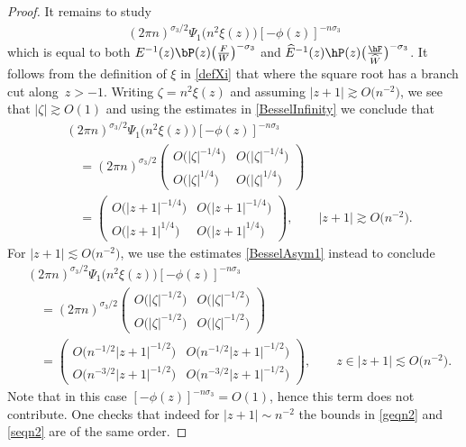 \begin{proof}
It remains to study
\begin{align*}
 (2\pi n)^{\sigma_3/2}\Psi_1\big(n^2 \xi(z)\big)[-\phi(z)]^{-n\sigma_3}
\end{align*}
which is equal to both $E^{-1}(z)\bP(z)\big(\frac{F}{W}\big)^{-\sigma_3}$ and $\widehat E^{-1}(z)\hP(z)\big(\frac{\hF}{\widehat W}\big)^{-\sigma_3}$. It follows from the definition of $\xi$ in \eqref{defXi} that  where the square root has a branch cut along~$z > -1$. Writing $\zeta=n^2 \xi(z)$ and assuming $|z+1| \gtrsim O\big(n^{-2}\big)$, we see that $|\zeta| \gtrsim O(1)$ and using the estimates in \eqref{BesselInfinity} we conclude that
\begin{align}\nonumber
& (2\pi n)^{\sigma_3/2}\Psi_1\big(n^2 \xi(z)\big)[-\phi(z)]^{-n\sigma_3} \\
&\quad= (2\pi n)^{\sigma_3/2}\begin{pmatrix}
 O\big(|\zeta|^{-1/4}\big) & O\big(|\zeta|^{-1/4}\big)
 \\
 O\big(|\zeta|^{1/4}\big) & O\big(|\zeta|^{1/4}\big)
 \end{pmatrix}\nonumber
 \\
 &\quad=
 \begin{pmatrix}
 O\big(|z+1|^{-1/4}\big) & O\big(|z+1|^{-1/4}\big)
 \\
 O\big(|z+1|^{1/4}\big) & O\big(|z+1|^{1/4}\big)
 \end{pmatrix}, \qquad |z+1| \gtrsim O\big(n^{-2}\big).\label{geqn2}
\end{align}
For $|z+1| \lesssim O\big(n^{-2}\big)$, we use the estimates \eqref{BesselAsym1} instead to conclude
\begin{align}
 &(2\pi n)^{\sigma_3/2}\Psi_1\big(n^2 \xi(z)\big)[-\phi(z)]^{-n\sigma_3} \nonumber\\
 &\quad= (2\pi n)^{\sigma_3/2}\begin{pmatrix}
 O\big(|\zeta|^{-1/2}\big) & O\big(|\zeta|^{-1/2}\big)
 \\
 O\big(|\zeta|^{-1/2}\big) & O\big(|\zeta|^{-1/2}\big)
 \end{pmatrix}\nonumber\\
&\quad= \begin{pmatrix}
 O\big(n^{-1/2}|z+1|^{-1/2}\big) & O\big(n^{-1/2}|z+1|^{-1/2}\big)
 \\
 O\big(n^{-3/2}|z+1|^{-1/2}\big) & O\big(n^{-3/2}|z+1|^{-1/2}\big)
 \end{pmatrix}, \qquad z \in |z+1| \lesssim O\big(n^{-2}\big).\label{seqn2}
\end{align}
Note that in this case $[-\phi(z)]^{-n\sigma_3} = O(1)$, hence this term does not contribute. One checks that indeed for $|z+1| \sim n^{-2}$ the bounds in \eqref{geqn2} and \eqref{seqn2} are of the same order.


\end{proof}
